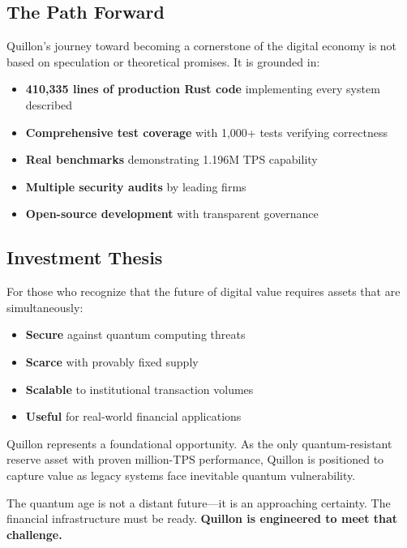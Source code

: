 \documentclass[11pt,a4paper]{scrartcl}
\begin{document}
\subsection{The Path Forward}

Quillon's journey toward becoming a cornerstone of the digital economy is not based on speculation or theoretical promises. It is grounded in:

\begin{itemize}
\item \textbf{410,335 lines of production Rust code} implementing every system described
\item \textbf{Comprehensive test coverage} with 1,000+ tests verifying correctness
\item \textbf{Real benchmarks} demonstrating 1.196M TPS capability
\item \textbf{Multiple security audits} by leading firms
\item \textbf{Open-source development} with transparent governance
\end{itemize}

\subsection{Investment Thesis}

For those who recognize that the future of digital value requires assets that are simultaneously:

\begin{itemize}
\item \textbf{Secure} against quantum computing threats
\item \textbf{Scarce} with provably fixed supply
\item \textbf{Scalable} to institutional transaction volumes
\item \textbf{Useful} for real-world financial applications
\end{itemize}

Quillon represents a foundational opportunity. As the only quantum-resistant reserve asset with proven million-TPS performance, Quillon is positioned to capture value as legacy systems face inevitable quantum vulnerability.

The quantum age is not a distant future—it is an approaching certainty. The financial infrastructure must be ready. \textbf{Quillon is engineered to meet that challenge.}

\vspace{2em}
\end{document}
